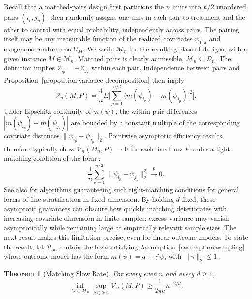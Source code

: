 \documentclass[letterpaper,12pt]{article}
\newtheorem{thm}{Theorem}[section]
\theoremstyle{definition}
\numberwithin{equation}{section}
\newcommand{\mc}{\mathcal}
\newcommand{\convp}{\overset{p}{\to}}
\begin{document}
Recall that a matched-pairs design first partitions the $n$ units into $n/2$ unordered pairs $(i_p,j_p)$, then randomly assigns one unit in each pair to treatment and the other to control with equal probability, independently across pairs.
The pairing itself may be any measurable function of the realized covariates $\psi_{1:n}$ and exogenous randomness $U_M$.
We write $\mathcal M_n$ for the resulting class of designs, with a given instance $M \in \mc M_n$. 
Matched pairs is clearly admissible, $\mc M_n \subseteq \mc D_n$.
The definition implies $Z_{i_p}=-Z_{j_p}$ within each pair. 
Independence between pairs and Proposition~\ref{proposition:variance-decomposition} then imply
\begin{equation}
\mc V_n(M,P)=\frac{4}{n}E \bigg[\sum_{p=1}^{n/2}\bigl(m(\psi_{i_p})-m(\psi_{j_p})\bigr)^2\bigg].
\end{equation}
Under Lipschitz continuity of $m(\psi)$, the within-pair differences $|m(\psi_{i_p})-m(\psi_{j_p})|$ are bounded by a constant multiple of the corresponding covariate distances $\|\psi_{i_p}-\psi_{j_p}\|_2$.
Pointwise asymptotic efficiency results therefore typically show $\mc V_n(M_n,P)\to0$ for each fixed law $P$ under a tight-matching condition of the form \citep{bai2021inference}:
\begin{equation}\label{equation:tight-matching}
\frac{1}{n}\sum_{p=1}^{n/2} \|\psi_{i_p}-\psi_{j_p}\|_2^2 \convp0.
\end{equation}
See also \citet{cytrynbaum2022local} for algorithms guaranteeing such tight-matching conditions for general forms of fine stratification in fixed dimension.
By holding $d$ fixed, these asymptotic guarantees can obscure how quickly matching deteriorates with increasing covariate dimension in finite samples: excess variance may vanish asymptotically while remaining large at empirically relevant sample sizes.
The next result makes this limitation precise, even for linear outcome models.
To state the result, let $\mathcal P_{\mathrm{lin}}$ contain the laws satisfying Assumption~\ref{assumption:sampling} whose outcome model has the form $m(\psi)=a+\gamma'\psi$, with $\|\gamma\|_2\leq1$.

\begin{thm}[Matching Slow Rate]\label{theorem:matching-lower-bound}
For every even $n$ and every $d\geq1$,
\begin{equation}\label{equation:matching-lower-bound}
\inf_{M\in\mathcal M_n} \sup_{P\in\mathcal P_{\mathrm{lin}}}\mc V_n(M,P) \geq \frac{1}{2\pi e}n^{-2/d}.
\end{equation}
\end{thm}
\end{document}
